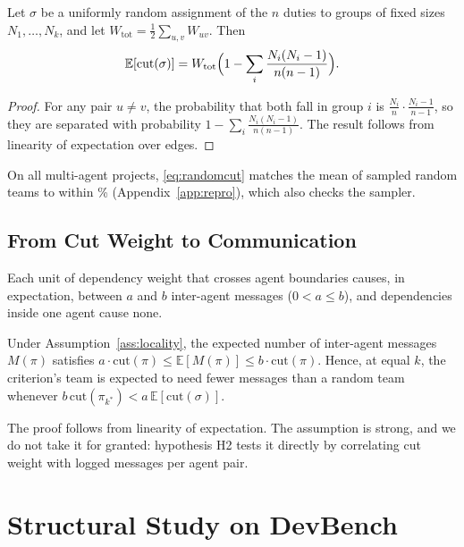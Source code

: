 \begin{proposition}
\label{prop:random}
Let $\sigma$ be a uniformly random assignment of the $n$ duties to groups of fixed sizes $N_1, \dots, N_k$, and let $W_{\text{tot}} = \frac12 \sum_{u,v} W_{uv}$. Then
\begin{equation}
\mathbb{E}[\mathrm{cut}(\sigma)] = W_{\text{tot}} \Bigl(1 - \sum_{i} \frac{N_i (N_i - 1)}{n (n-1)}\Bigr).
\label{eq:randomcut}
\end{equation}
\end{proposition}
\begin{proof}
For any pair $u \neq v$, the probability that both fall in group $i$ is $\frac{N_i}{n}\cdot\frac{N_i - 1}{n-1}$, so they are separated with probability $1 - \sum_i \frac{N_i(N_i-1)}{n(n-1)}$. The result follows from linearity of expectation over edges.
\end{proof}
On all \NMulti multi-agent projects, \eqref{eq:randomcut} matches the mean of \Draws sampled random teams to within \CFErr\% (Appendix~\ref{app:repro}), which also checks the sampler.

\subsection{From Cut Weight to Communication}
\begin{assumption}[Locality]
\label{ass:locality}
Each unit of dependency weight that crosses agent boundaries causes, in expectation, between $a$ and $b$ inter-agent messages ($0 < a \le b$), and dependencies inside one agent cause none.
\end{assumption}
\begin{proposition}
\label{prop:messages}
Under Assumption~\ref{ass:locality}, the expected number of inter-agent messages $M(\pi)$ satisfies $a \cdot \mathrm{cut}(\pi) \le \mathbb{E}[M(\pi)] \le b \cdot \mathrm{cut}(\pi)$. Hence, at equal $k$, the criterion's team is expected to need fewer messages than a random team whenever $b\,\mathrm{cut}(\pi_{k^\ast}) < a\,\mathbb{E}[\mathrm{cut}(\sigma)]$.
\end{proposition}
The proof follows from linearity of expectation. The assumption is strong, and we do not take it for granted: hypothesis H2 tests it directly by correlating cut weight with logged messages per agent pair.

\section{Structural Study on DevBench}
\label{sec:structural}

